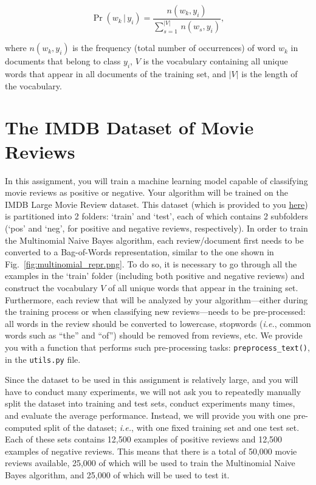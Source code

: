 \documentclass[letterpaper]{article}
\begin{document}
\begin{equation}
   \Pr(w_k \, | \, y_i) = \frac{n(w_k, y_i)}{\sum_{s=1}^{|V|} \, n(w_s, y_i)},
\end{equation}

\noindent where $n(w_k, y_i)$ is the frequency (total number of occurrences) of word $w_k$ in documents that belong to class $y_i$, $V$ is the vocabulary containing all unique words that appear in all documents of the training set, and $|V|$ is the length of the vocabulary.

\section{The IMDB Dataset of Movie Reviews}

In this assignment, you will train a machine learning model capable of classifying movie reviews as positive or negative. Your algorithm will be trained on the IMDB Large Movie Review dataset. This dataset (which is provided to you \href{https://people.cs.umass.edu/~bsilva/courses/CMPSCI_589/Spring2024/homeworks/hw2.zip}{here}) is partitioned into 2 folders: ‘train’ and ‘test’, each of which contains 2 subfolders (‘pos’ and ‘neg’, for positive and negative reviews, respectively). In order to train the Multinomial Naive Bayes algorithm, each review/document first needs to be converted to a Bag-of-Words representation, similar to the one shown in Fig.~\ref{fig:multinomial_repr.png}. To do so, it is necessary to go through all the examples in the ‘train’ folder (including both positive and negative reviews) and construct the vocabulary $V$ of all unique words that appear in the training set. Furthermore, each review that will be analyzed by your algorithm---either during the training process or when classifying new reviews---needs to be pre-processed: all words in the review should be converted to lowercase, stopwords (\textit{i.e.}, common words such as ``the'' and ``of'') should be removed from reviews, etc. We provide you with a function that performs such pre-processing tasks: \texttt{preprocess\_text()}, in the \texttt{utils.py} file. 

Since the dataset to be used in this assignment is relatively large, and you will have to conduct many experiments, we will not ask you to repeatedly manually split the dataset into training and test sets, conduct experiments many times, and evaluate the average performance. Instead, we will provide you with one pre-computed split of the dataset; \textit{i.e.}, with one fixed training set and one test set. Each of these sets contains 12,500 examples of positive reviews and 12,500 examples of negative reviews. This means that there is a total of 50,000 movie reviews available, 25,000 of which will be used to train the Multinomial Naive Bayes algorithm, and 25,000 of which will be used to test it.
\end{document}
